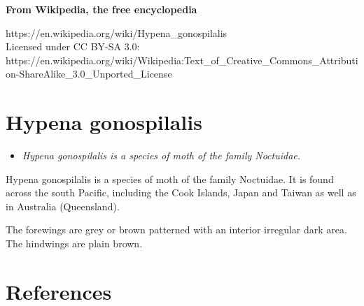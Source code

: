 \textbf{From Wikipedia, the free encyclopedia}

https://en.wikipedia.org/wiki/Hypena\_gonospilalis\\
Licensed under CC BY-SA 3.0:\\
https://en.wikipedia.org/wiki/Wikipedia:Text\_of\_Creative\_Commons\_Attribution-ShareAlike\_3.0\_Unported\_License

\section{Hypena gonospilalis}\label{hypena-gonospilalis}

\begin{itemize}
\item
  \emph{Hypena gonospilalis is a species of moth of the family
  Noctuidae.}
\end{itemize}

Hypena gonospilalis is a species of moth of the family Noctuidae. It is
found across the south Pacific, including the Cook Islands, Japan and
Taiwan as well as in Australia (Queensland).

The forewings are grey or brown patterned with an interior irregular
dark area. The hindwings are plain brown.

\section{References}\label{references}
